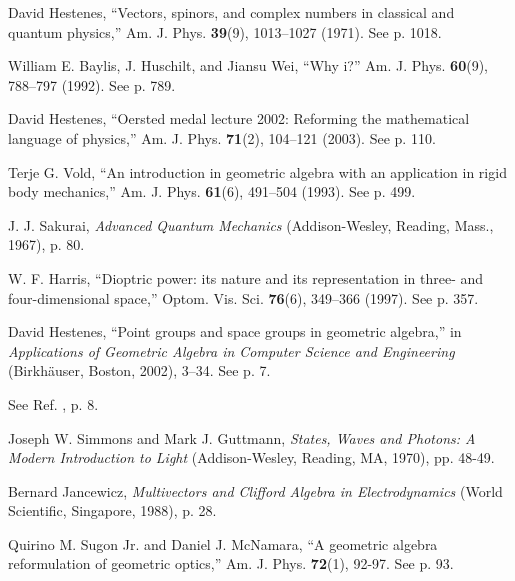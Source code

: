 \documentclass[11pt,twocolumn]{article}
\begin{document}
\begin{thebibliography}{99}
\footnotesize

David Hestenes, ``Vectors, spinors, and complex numbers in classical and quantum physics,'' Am. J. Phys. \textbf{39}(9), 1013--1027 (1971).  See p. 1018.

William E. Baylis, J. Huschilt, and Jiansu Wei, ``Why i?'' Am. J. Phys. \textbf{60}(9), 788--797 (1992).  See p. 789.

David Hestenes, ``Oersted medal lecture 2002: Reforming the mathematical language of physics,'' Am. J. Phys. \textbf{71}(2), 104--121 (2003).  See p. 110.

Terje G. Vold, ``An introduction in geometric algebra with an application in rigid body mechanics,'' Am. J. Phys. \textbf{61}(6), 491--504 (1993).  See p. 499.

J. J. Sakurai, \textsl{Advanced Quantum Mechanics} (Addison-Wesley, Reading, Mass., 1967), p. 80.

\newpage
{}
W. F. Harris, ``Dioptric power: its nature and its representation in three- and four-dimensional space,'' Optom. Vis. Sci. \textbf{76}(6), 349--366 (1997).  See p. 357.

David Hestenes, ``Point groups and space groups in geometric algebra,'' in \textsl{Applications of Geometric Algebra in Computer Science and Engineering} (Birkh\"auser, Boston, 2002), 3--34.  See p. 7.

See Ref. \cite{Hestenes_2002_AGACSEpp3-34_p7}, p. 8.

Joseph W. Simmons and Mark J. Guttmann, \textsl{States, Waves and Photons: A Modern Introduction to Light} (Addison-Wesley, Reading, MA, 1970), pp. 48-49.

Bernard Jancewicz, \textsl{Multivectors and Clifford Algebra in Electrodynamics} (World Scientific, Singapore, 1988), p. 28.

Quirino M. Sugon Jr. and Daniel J. McNamara, ``A geometric algebra reformulation of geometric optics,'' Am. J. Phys. \textbf{72}(1), 92-97.  See p. 93.


\end{thebibliography}
\end{document}
